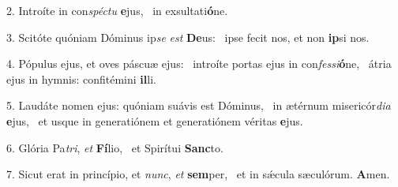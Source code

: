 2. Introíte in con\textit{spéc}\textit{tu} \textbf{e}jus, \ast\  in exsultati\textbf{ó}ne.\

3. Scitóte quóniam Dóminus ip\textit{se} \textit{est} \textbf{De}us: \ast\  ipse fecit nos, et non \textbf{ip}si nos.\

4. Pópulus ejus, et oves páscuæ ejus: \dag\  introíte portas ejus in con\textit{fes}\textit{si}\textbf{ó}ne, \ast\  átria ejus in hymnis: confitémini \textbf{il}li.\

5. Laudáte nomen ejus: quóniam suávis est Dóminus, \dag\  in ætérnum misericór\textit{di}\textit{a} \textbf{e}jus, \ast\  et usque in generatiónem et generatiónem véritas \textbf{e}jus.\

6. Glória Pa\textit{tri}, \textit{et} \textbf{Fí}lio, \ast\  et Spirítui \textbf{Sanc}to.\

7. Sicut erat in princípio, et \textit{nunc}, \textit{et} \textbf{sem}per, \ast\  et in sǽcula sæculórum. \textbf{A}men.\

